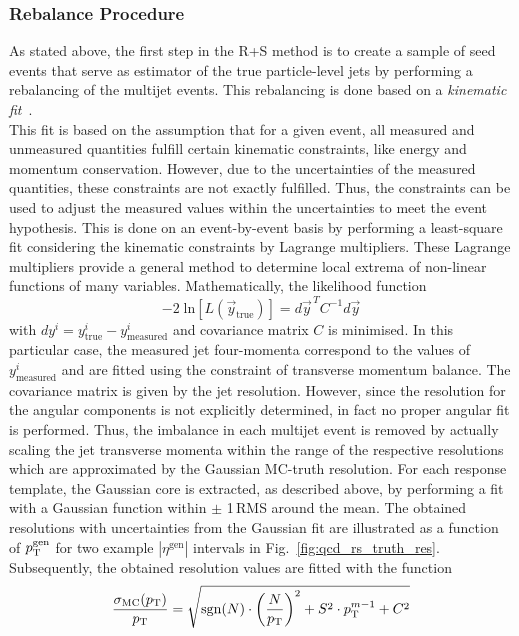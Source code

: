 \subsubsection*{Rebalance Procedure}
\label{subsubsec:qcd_rebalancing}
As stated above, the first step in the R+S method is to create a sample of seed events that serve as estimator of the true particle-level jets by performing a rebalancing of the multijet events. This rebalancing is done based on a \textit{kinematic fit}~\cite{D'Hondt:926540}. \\
This fit is based on the assumption that for a given event, all measured and unmeasured quantities fulfill certain kinematic constraints, like energy and momentum conservation. However, due to the uncertainties of the measured quantities, these constraints are not exactly fulfilled. Thus, the constraints can be used to adjust the measured values within the uncertainties to meet the event hypothesis. This is done on an event-by-event basis by performing a least-square fit considering the kinematic constraints by Lagrange multipliers. These Lagrange multipliers provide a general method to determine local extrema of non-linear functions of many variables. Mathematically, the likelihood function 
\begin{equation}
-2 \; \mathrm{ln}[L(\vec{y}_\mathrm{true})] = d\vec{y}^{\,T} C^{-1} d \vec{y} 
\end{equation}
with $dy^i = y_{\mathrm{true}}^i - y_{\mathrm{measured}}^i$ and covariance matrix $C$ is minimised. In this particular case, the measured jet four-momenta correspond to the values of $y_{\mathrm{measured}}^i$ and are fitted using the constraint of transverse momentum balance. The covariance matrix is given by the jet resolution. However, since the resolution for the angular components is not explicitly determined, in fact no proper angular fit is performed. Thus, the imbalance in each multijet event is removed by actually scaling the jet transverse momenta within the range of the respective resolutions which are approximated by the Gaussian MC-truth resolution. For each response template, the Gaussian core is extracted, as described above, by performing a fit with a Gaussian function within $\pm$ 1\,RMS around the mean. The obtained resolutions with uncertainties from the Gaussian fit are illustrated as a function of $p_{\text{T}}^\mathrm{gen}$ for two example $|\eta^\mathrm{gen}|$ intervals in Fig.~\ref{fig:qcd_rs_truth_res}. Subsequently, the obtained resolution values are fitted with the function
\begin{equation}
\frac{\sigma_\mathrm{MC}(p_{\text{T}})}{p_{\text{T}}} = \sqrt{\mathrm{sgn}(N) \cdot \left(\frac{N}{p_{\text{T}}}\right)^2 + S^2 \cdot p_{\text{T}}^{m-1} + C^2} 
\end{equation} 
